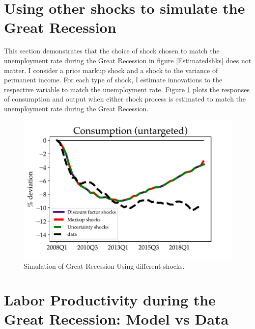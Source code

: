 





\section{Using other shocks to simulate the Great Recession}

This section demonstrates that the choice of shock chosen to match the unemployment rate during the Great Recession in figure \ref{Estimatedshks} does not matter. I consider a price markup shock and a shock to the variance of permanent income. For each type of shock, I estimate innovations to the respective variable to match the unemployment rate.  Figure \ref{other_shocks} plots the responses of consumption and output when either shock process is estimated to match the unemployment rate during the Great Recession.
\begin{figure}[!ht]
    \centering
   \begin{minipage}{0.47\textwidth}
        \centering
        \includegraphics[scale=.6]{text/chapter1/Figures/GR_sim/C_comparisons} %
    \end{minipage}\hfill
    \caption{Simulation of Great Recession Using different shocks.}
    \label{other_shocks}
\end{figure}



\section{Labor Productivity during the Great Recession: Model vs Data}


